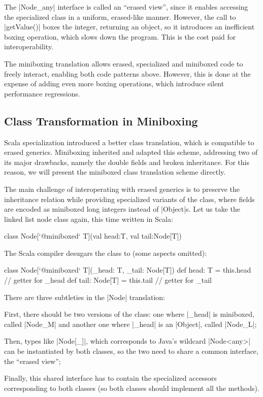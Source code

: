 The |Node_any| interface is called an ``erased view'', since it enables accessing the specialized class in a uniform, erased-like manner. However, the call to |getValue()| boxes the integer, returning an object, so it introduces an inefficient boxing operation, which slows down the program. This is the cost paid for interoperability.

The miniboxing translation allows erased, specialized and miniboxed code to freely interact, enabling both code patterns above. However, this is done at the expense of adding even more boxing operations, which introduce silent performance regressions.

\subsection{Class Transformation in Miniboxing}

Scala specialization \cite{iuli-thesis, specialization-iuli} introduced a better class translation, which is compatible to erased generics. Miniboxing \cite{miniboxing} inherited and adapted this scheme, addressing two of its major drawbacks, namely the double fields and broken inheritance. For this reason, we will present the miniboxed class translation scheme directly.

The main challenge of interoperating with erased generics is to preserve the inheritance relation while providing specialized variants of the class, where fields are encoded as miniboxed long integers instead of |Object|s. Let us take the linked list node class again, this time written in Scala:

\begin{lstlisting-nobreak}
 class Node[`@miniboxed` T](val head:T, val tail:Node[T])
\end{lstlisting-nobreak}

The Scala compiler desugars the class to (some aspects omitted):

\begin{lstlisting-nobreak}
 class Node[`@miniboxed` T](_head: T, _tail: Node[T]) {
   def head: T = this.head                 // getter for _head
   def tail: Node[T] = this.tail // getter for _tail
 }
\end{lstlisting-nobreak}

There are three subtleties in the |Node| translation:
\begin{compactitem}
  \item First, there should be two versions of the class: one where |_head| is miniboxed, called |Node_M| and another one where |_head| is an |Object|, called |Node_L|;
  \item Then, types like |Node[_]|, which corresponds to Java's wildcard |Node<any>| can be instantiated by both classes, so the two need to share a common interface, the ``erased view'';
  \item Finally, this shared interface has to contain the specialized accessors corresponding to both classes (so both classes should implement all the methods).
\end{compactitem}

